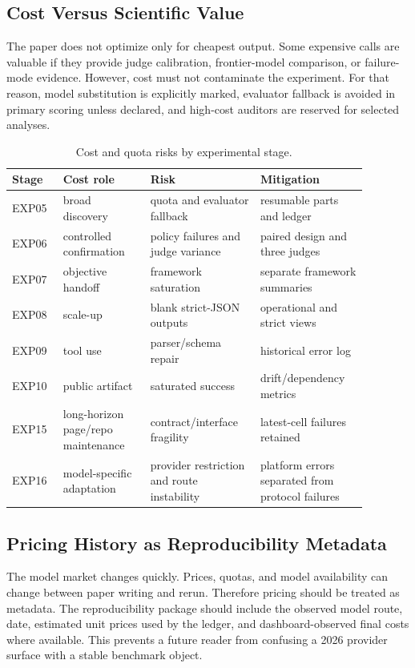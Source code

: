 \documentclass[11pt]{article}
\begin{document}
\subsection{Cost Versus Scientific Value}
The paper does not optimize only for cheapest output. Some expensive calls are valuable if they provide judge calibration, frontier-model comparison, or failure-mode evidence. However, cost must not contaminate the experiment. For that reason, model substitution is explicitly marked, evaluator fallback is avoided in primary scoring unless declared, and high-cost auditors are reserved for selected analyses.

\begin{table}[ht]
\centering
\small
\begin{tabular}{p{0.12\linewidth}p{0.22\linewidth}p{0.27\linewidth}p{0.27\linewidth}}
\toprule
Stage & Cost role & Risk & Mitigation \\
\midrule
EXP05 & broad discovery & quota and evaluator fallback & resumable parts and ledger \\
EXP06 & controlled confirmation & policy failures and judge variance & paired design and three judges \\
EXP07 & objective handoff & framework saturation & separate framework summaries \\
EXP08 & scale-up & blank strict-JSON outputs & operational and strict views \\
EXP09 & tool use & parser/schema repair & historical error log \\
EXP10 & public artifact & saturated success & drift/dependency metrics \\
EXP15 & long-horizon page/repo maintenance & contract/interface fragility & latest-cell failures retained \\
EXP16 & model-specific adaptation & provider restriction and route instability & platform errors separated from protocol failures \\
\bottomrule
\end{tabular}
\caption{Cost and quota risks by experimental stage.}
\end{table}

\subsection{Pricing History as Reproducibility Metadata}
The model market changes quickly. Prices, quotas, and model availability can change between paper writing and rerun. Therefore pricing should be treated as metadata. The reproducibility package should include the observed model route, date, estimated unit prices used by the ledger, and dashboard-observed final costs where available. This prevents a future reader from confusing a 2026 provider surface with a stable benchmark object.
\end{document}
